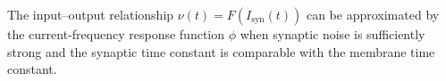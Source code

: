 \documentclass[12pt]{article}
\begin{document}
The input--output relationship $\nu(t) = F(I_{\text{syn}}(t))$ can be approximated by the current-frequency response function $\phi$ \citep{Brunel2001, FourcaudBrunel2002} when synaptic noise is sufficiently strong and the synaptic time constant is comparable with the membrane time constant.



\end{document}

